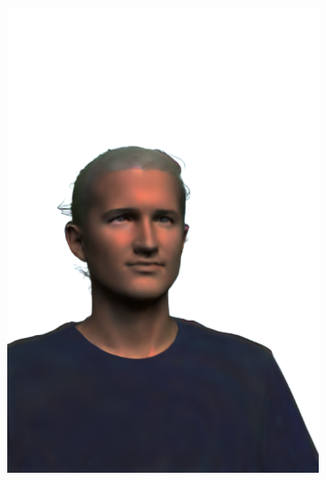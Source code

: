 \begin{figure}[ht]
\begin{subfigure}{0.08\linewidth}
        \includegraphics[width=\textwidth]{Figures/results/high/ephra_3d/11_render.png}

\end{subfigure}
\end{figure}

